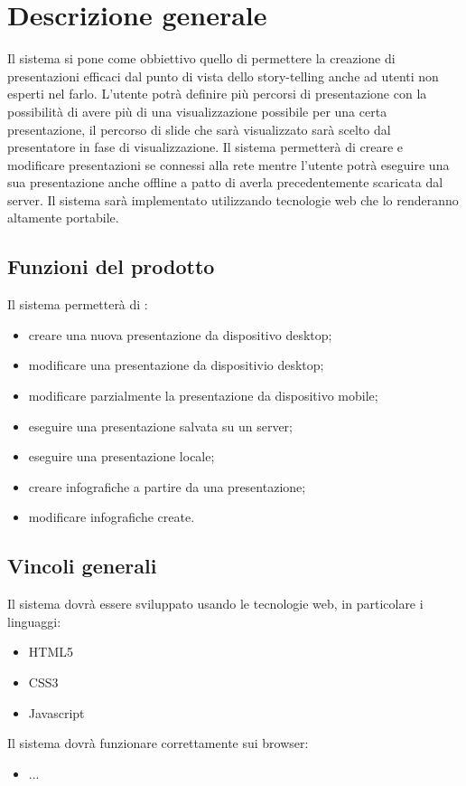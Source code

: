 \section{Descrizione generale}{
Il sistema si pone come obbiettivo quello di permettere la creazione di presentazioni efficaci dal punto di vista dello story-telling anche ad utenti non esperti nel farlo.
L'utente potrà definire più percorsi di presentazione con la possibilità di avere più di una visualizzazione possibile per una certa presentazione, il percorso di slide che sarà visualizzato sarà scelto dal presentatore in fase di visualizzazione.
Il sistema permetterà di creare e modificare presentazioni se connessi alla rete mentre l'utente potrà eseguire una sua presentazione anche offline a patto di averla precedentemente scaricata dal server.
Il sistema sarà implementato utilizzando tecnologie web che lo renderanno altamente portabile.

\subsection{Funzioni del prodotto}{
	Il sistema permetterà di :
	\begin{itemize}
		\item creare una nuova presentazione da dispositivo desktop;
		\item modificare una presentazione da dispositivio desktop;
		\item modificare parzialmente la presentazione da dispositivo mobile;
		\item eseguire una presentazione salvata su un server;
		\item eseguire una presentazione locale;
		\item creare infografiche a partire da una presentazione;
		\item modificare infografiche create.
	\end{itemize}
}
\subsection{Vincoli generali}{
	Il sistema dovrà essere sviluppato usando le tecnologie web, in particolare i linguaggi:
	\begin{itemize}
		\item HTML5
		\item CSS3
		\item Javascript
	\end{itemize}
	
	\noindent
	Il sistema dovrà funzionare correttamente sui browser:
	\begin{itemize}
	\item ...
	\end{itemize}
	}
}